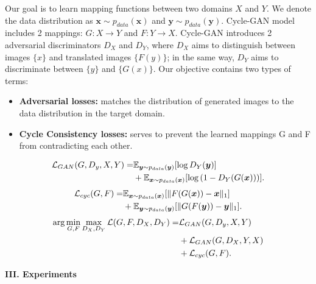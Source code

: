 \documentclass[a4paper]{article}
\begin{document}
\large{Our goal is to learn mapping functions between two domains $X$ and $Y$. We denote the data distribution as $\boldsymbol x \sim p_{data}(\boldsymbol x)$ and $\boldsymbol y \sim p_{data}(\boldsymbol y)$. \textsf{Cycle-GAN} model includes 2 mappings: $G:X \rightarrow Y$ and $F: Y\rightarrow X$. \textsf{Cycle-GAN} introduces 2 adversarial discriminators $D_X$ and $D_Y$, where $D_X$ aims to distinguish between images $\{x\}$ and translated images $\{ F(y) \}$; in the same way, $D_Y$ aims to discriminate between $\{y\}$ and $\{G(x)\}$. Our objective contains two types of terms: 

\begin{itemize}
    \item \textbf{Adversarial losses:} matches the distribution of generated images to the data distribution in the target domain.
    \item \textbf{Cycle Consistency losses:} serves to prevent the learned
mappings G and F from contradicting each other.
\end{itemize}

\begin{align}
    \mathcal{L}_{GAN}(G,D_y,X,Y)=&\mathbb{E}_{ \boldsymbol y\sim p_{data}(\boldsymbol y)} [\log D_Y(\boldsymbol y)] \notag \\
    &+ \mathbb{E}_{ \boldsymbol x\sim p_{data}(\boldsymbol x)} [\log {(1-D_Y(G(\boldsymbol x)))}].
\end{align}
\begin{align}
    \mathcal{L}_{cyc}(G,F)=&\mathbb{E}_{ \boldsymbol x\sim p_{data}(\boldsymbol x)} [\|F(G(\boldsymbol x))-\boldsymbol x\|_1] \notag \\ 
    &+ \mathbb{E}_{ \boldsymbol y\sim p_{data}(\boldsymbol y)} [\|G(F(\boldsymbol y))-\boldsymbol y\|_1].
\end{align}
\begin{align}
    \arg \mathop{\min}_{G,F}\mathop{\max}_{D_{X},D_{Y}}\mathcal{L}(G,F,D_X,D_Y)=&\mathcal{L}_{GAN}(G,D_y,X,Y) \notag\\
    &+\mathcal{L}_{GAN}(G,D_X,Y,X)\notag\\
    &+\mathcal{L}_{cyc}(G,F).
\end{align}

}

\vspace{5mm}
\begin{center}
\LARGE\textbf{III. Experiments} \\
\end{center}
\vspace{2mm}
\end{document}
